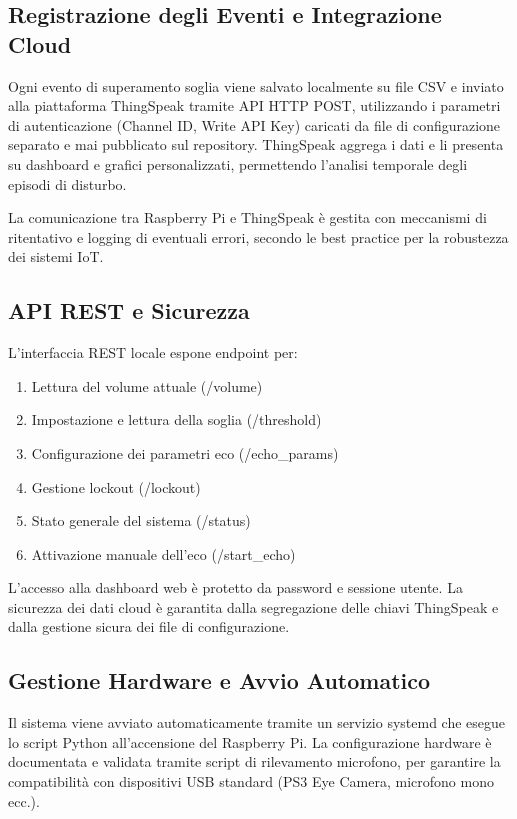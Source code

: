 \subsection{Registrazione degli Eventi e Integrazione Cloud}

Ogni evento di superamento soglia viene salvato localmente su file CSV e inviato alla piattaforma ThingSpeak tramite API HTTP POST, utilizzando i parametri di autenticazione (Channel ID, Write API Key) caricati da file di configurazione separato e mai pubblicato sul repository. ThingSpeak aggrega i dati e li presenta su dashboard e grafici personalizzati, permettendo l’analisi temporale degli episodi di disturbo.

La comunicazione tra Raspberry Pi e ThingSpeak è gestita con meccanismi di ritentativo e logging di eventuali errori, secondo le best practice per la robustezza dei sistemi IoT.

\subsection{API REST e Sicurezza}

L’interfaccia REST locale espone endpoint per:
\begin{enumerate}[noitemsep]
    \item Lettura del volume attuale (/volume)
    \item Impostazione e lettura della soglia (/threshold)
    \item Configurazione dei parametri eco (/echo\_params)
    \item Gestione lockout (/lockout)
    \item Stato generale del sistema (/status)
    \item Attivazione manuale dell’eco (/start\_echo)
\end{enumerate}

L’accesso alla dashboard web è protetto da password e sessione utente. La sicurezza dei dati cloud è garantita dalla segregazione delle chiavi ThingSpeak e dalla gestione sicura dei file di configurazione.

\subsection{Gestione Hardware e Avvio Automatico}

Il sistema viene avviato automaticamente tramite un servizio systemd che esegue lo script Python all’accensione del Raspberry Pi. La configurazione hardware è documentata e validata tramite script di rilevamento microfono, per garantire la compatibilità con dispositivi USB standard (PS3 Eye Camera, microfono mono ecc.).

